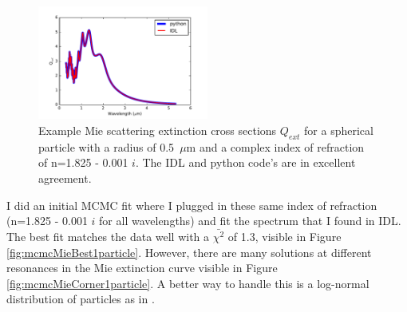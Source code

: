 \documentclass[twocolumn]{aastex6}
\begin{document}
\begin{figure}
\begin{centering}
\includegraphics[width=0.5\textwidth]{python_vs_IDL_example.pdf}
\caption{Example Mie scattering extinction cross sections $Q_{ext}$ for a spherical particle with a radius of 0.5~$\mu$m and a complex index of refraction of n=1.825 - 0.001 $i$. The IDL and python code's are in excellent agreement.}\label{fig:IDLvsPython}
\end{centering}
\end{figure}

I did an initial MCMC fit where I plugged in these same index of refraction (n=1.825 - 0.001 $i$ for all wavelengths) and fit the spectrum that I found in IDL.
The best fit matches the data well with a $\bar{\chi^2}$ of 1.3, visible in Figure \ref{fig:mcmcMieBest1particle}.
However, there are many solutions at different resonances in the Mie extinction curve visible in Figure \ref{fig:mcmcMieCorner1particle}.
A better way to handle this is a log-normal distribution of particles as in \citet{schlawin2016}.
\end{document}
